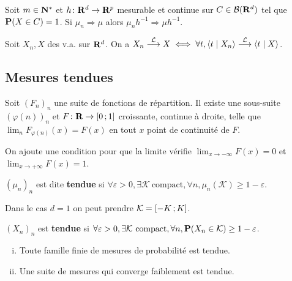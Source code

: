	\begin{thm}
		Soit $m \in \mathbf{N}^*$ et $h \colon \mathbf{R}^d \to \mathbf{R}^p$ mesurable et continue sur $C \in \mathcal{B}(\mathbf{R}^d)$ tel que $\mathbf{P}(X \in C) = 1$.
		Si $\mu_n \Rightarrow \mu$ alors $\mu_n h^{-1} \Rightarrow \mu h^{-1}$.
	\end{thm}
	
	\begin{thm}
		Soit $X_n, X$ des v.a. sur $\mathbf{R}^d$.
		On a $X_n \overset{\mathcal{L}}{\longrightarrow} X \iff \forall t, \left\langle t \mid X_n \right\rangle \overset{\mathcal{L}}{\longrightarrow} \left\langle t \mid X \right\rangle$.
	\end{thm}


\subsection{Mesures tendues}

	\begin{lem}
		Soit $(F_n)_n$ une suite de fonctions de répartition.
		Il existe une sous-suite $(\varphi(n))_n$ et $F \colon \mathbf{R} \to \mathopen{}\mathclose{\left[0\mathclose{}\mathpunct{};1\right]}$ croissante, continue à droite, telle que $\lim_n F_{\varphi(n)}(x) = F(x)$ en tout $x$ point de continuité de $F$.
	\end{lem}
	
	On ajoute une condition pour que la limite vérifie $\lim_{x \to -\infty} F(x) = 0$ et $\lim_{x \to +\infty} F(x) = 1$.

	\begin{defn}
		$(\mu_n)_n$ est dite \textbf{tendue} si $\forall \varepsilon > 0, \exists \mathcal{K} \ \text{compact}, \forall n, \mu_n(\mathcal{K}) \geq 1 - \varepsilon$.
	\end{defn}

	Dans le cas $d = 1$ on peut prendre $\mathcal{K} = \mathopen{}\mathclose{\left[-K\mathclose{}\mathpunct{};K\right]}$.
	
	\begin{defn}
		$(X_n)_n$ est \textbf{tendue} si $\forall \varepsilon > 0, \exists \mathcal{K} \ \text{compact}, \forall n, \mathbf{P}(X_n \in \mathcal{K}) \geq 1 - \varepsilon$.
	\end{defn}
	
	\begin{pop}
		\begin{enumerate}[(i)]
			\item Toute famille finie de mesures de probabilité est tendue.
			\item Une suite de mesures qui converge faiblement est tendue.
		\end{enumerate}
	\end{pop}

